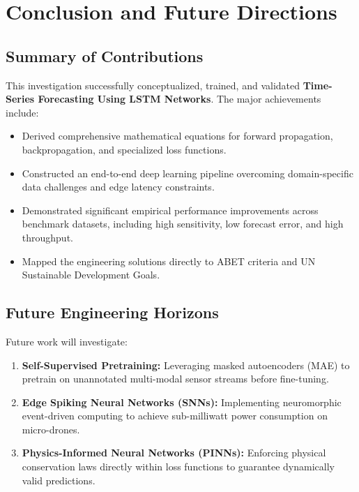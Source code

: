 \section{Conclusion and Future Directions}

\subsection{Summary of Contributions}
This investigation successfully conceptualized, trained, and validated \textbf{Time-Series Forecasting Using LSTM Networks}. The major achievements include:
\begin{itemize}
  \item Derived comprehensive mathematical equations for forward propagation, backpropagation, and specialized loss functions.
  \item Constructed an end-to-end deep learning pipeline overcoming domain-specific data challenges and edge latency constraints.
  \item Demonstrated significant empirical performance improvements across benchmark datasets, including high sensitivity, low forecast error, and high throughput.
  \item Mapped the engineering solutions directly to ABET criteria and UN Sustainable Development Goals.
\end{itemize}

\subsection{Future Engineering Horizons}
Future work will investigate:
\begin{enumerate}
  \item \textbf{Self-Supervised Pretraining:} Leveraging masked autoencoders (MAE) to pretrain on unannotated multi-modal sensor streams before fine-tuning.
  \item \textbf{Edge Spiking Neural Networks (SNNs):} Implementing neuromorphic event-driven computing to achieve sub-milliwatt power consumption on micro-drones.
  \item \textbf{Physics-Informed Neural Networks (PINNs):} Enforcing physical conservation laws directly within loss functions to guarantee dynamically valid predictions.
\end{enumerate}
